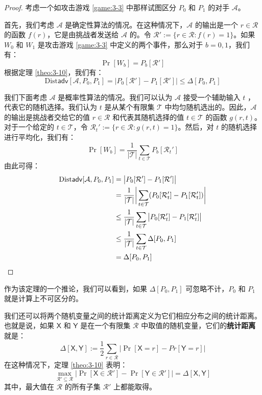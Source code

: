 \begin{proof}
考虑一个如攻击游戏 \ref{game:3-3} 中那样试图区分 $P_0$ 和 $P_1$ 的对手 $\mathcal A$。

首先，我们考虑 $\mathcal A$ 是确定性算法的情况。在这种情况下，$\mathcal A$ 的输出是一个 $r\in\mathcal{R}$ 的函数 $f(r)$，它是由挑战者发送给 $\mathcal A$ 的。令 $\mathcal{R}':=\{r\in\mathcal{R}:f(r)=1\}$。如果 $W_0$ 和 $W_1$ 是攻击游戏 \ref{game:3-3} 中定义的两个事件，那么对于 $b=0,1$，我们有：
\[
\Pr[W_b]=P_b[\mathcal{R}']
\]
根据定理 \ref{theo:3-10}，我们有：
\[
\mathrm{Dist}\mathsf{adv}[\mathcal{A},P_0,P_1]
=\big\lvert
P_0[\mathcal{R}']-P_1[\mathcal{R}']
\big\rvert
\leq\Delta[P_0, P_1]
\]

我们下面考虑 $\mathcal A$ 是概率性算法的情况。我们可以认为 $\mathcal A$ 接受一个辅助输入 $t$ ，代表它的随机选择。我们认为 $t$ 是从某个有限集 $\mathcal{T}$ 中均匀随机选出的。因此，$\mathcal A$ 的输出是挑战者交给它的值 $r\in\mathcal{R}$ 和代表其随机选择的值 $t\in\mathcal{T}$ 的函数 $g(r,t)$。对于一个给定的 $t\in\mathcal{T}$，令 $\mathcal{R}_t':=\{r\in\mathcal{R}:g(r,t)=1\}$。然后，对 $t$ 的随机选择进行平均化，我们有：
\[
\Pr[W_b]
=\frac{1}{|\mathcal{T}|}
\sum_{t\in\mathcal{T}}P_b[\mathcal{R}_t']
\]
由此可得：
\[
\begin{aligned}
{\rm Dist\mathsf{adv}}[\mathcal{A},P_0,P_1]
&=\big\lvert P_0[\mathcal{R}']-P_1[\mathcal{R}']\big\rvert\\
&=\frac{1}{|\mathcal{T}|}\bigg\lvert\sum_{t\in\mathcal{T}}(P_0[\mathcal{R}_t']-P_1[\mathcal{R}_t'])\bigg\rvert\\
&\leq\frac{1}{|\mathcal{T}|}\sum_{t\in\mathcal{T}}\big\lvert P_0[\mathcal{R}_t']-P_1[\mathcal{R}_t']\big\rvert\\
&\leq\frac{1}{|\mathcal{T}|}\sum_{t\in\mathcal{T}}\Delta[P_0,P_1]\\
&=\Delta[P_0,P_1]\qedhere
\end{aligned}
\]
\end{proof}

作为该定理的一个推论，我们可以看到，如果 $\Delta[P_0,P_1]$ 可忽略不计，$P_0$ 和 $P_1$ 就是计算上不可区分的。

\vspace{5pt}

我们还可以将两个随机变量之间的统计距离定义为它们相应分布之间的统计距离。也就是说，如果 $\mathsf{X}$ 和 $\mathsf{Y}$ 是在一个有限集 $\mathcal{R}$ 中取值的随机变量，它们的\textbf{统计距离}就是：
\[
\Delta[\mathsf{X},\mathsf{Y}]
:=
\frac{1}{2}
\sum_{r\in\mathcal{R}}
\big\lvert
\Pr[\mathsf{X}=r]-Pr[\mathsf{Y}=r]
\big\rvert
\]
在这种情况下，定理 \ref{theo:3-10} 表明：
\[
\max_{\mathcal{R}'\subseteq\mathcal{R}}
\big\lvert
\Pr[\mathsf{X}\in\mathcal{R}']-\Pr[\mathsf{Y}\in\mathcal{R}']
\big\rvert
=\Delta[\mathsf{X},\mathsf{Y}]
\]
其中，最大值在 $\mathcal R$ 的所有子集 $\mathcal R'$ 上都能取得。

